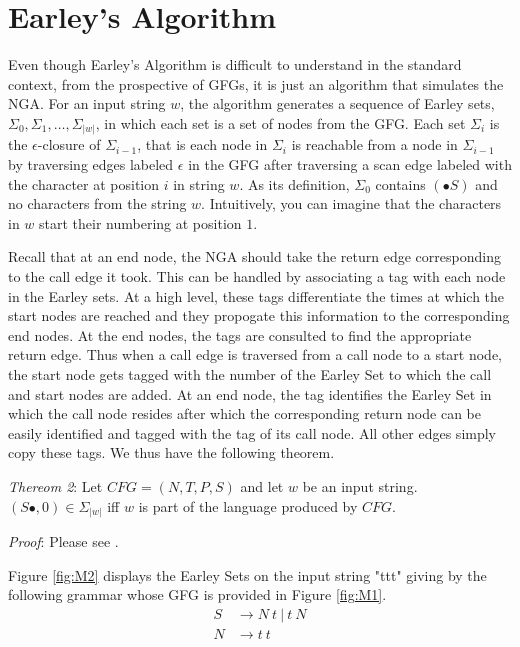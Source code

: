 \documentclass{sigplanconf}
\begin{document}
\section{Earley's Algorithm}
Even though Earley's Algorithm is difficult to understand in the standard context, from the prospective of GFGs, it is just an algorithm that simulates the NGA. For an input string $w$, the algorithm generates a sequence of Earley sets, $\Sigma_0, \Sigma_1, \dots, \Sigma_{|w|}$, in which each set is a set of nodes from the GFG. Each set $\Sigma_i$ is the $\epsilon$-closure of $\Sigma_{i-1}$, that is each node in $\Sigma_i$ is reachable from a node in $\Sigma_{i-1}$ by traversing edges labeled $\epsilon$ in the GFG after traversing a scan edge labeled with the character at position $i$ in string $w$. As its definition, $\Sigma_0$ contains $(\bullet{S})$ and no characters from the string $w$. Intuitively, you can imagine that the characters in $w$ start their numbering at position $1$. 

Recall that at an end node, the NGA should take the return edge corresponding to the call edge it took. This can be handled by associating a tag with each node in the Earley sets. At a high level, these tags differentiate the times at which the start nodes are reached and they propogate this information to the corresponding end nodes. At the end nodes, the tags are consulted to find the appropriate return edge. Thus when a call edge is traversed from a call node to a start node, the start node gets tagged with the number of the Earley Set to which the call and start nodes are added. At an end node, the tag identifies the Earley Set in which the call node resides after which the corresponding return node can be easily identified and tagged with the tag of its call node. All other edges simply copy these tags. We thus have the following theorem.

\textit{Thereom 2}: Let $CFG=(N, T, P, S)$ and let $w$ be an input string. $(S\bullet, 0)\in{\Sigma_{|w|}}$ iff $w$ is part of the language produced by $CFG$.

\textit{Proof}: Please see \cite{bilardi-pingali}.

Figure \ref{fig:M2} displays the Earley Sets on the input string "ttt" giving by the following grammar whose GFG is provided in Figure \ref{fig:M1}.
\begin{align*}
S&\longrightarrow{N \: t \: | \: t \: N} \\
N&\longrightarrow{t \: t}
\end{align*}
\end{document}
